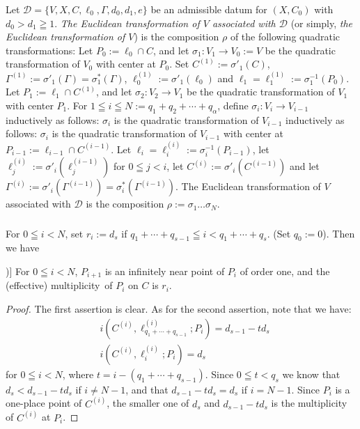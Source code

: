 \subsubsection{}\label{chap2:1.3.1}
\begin{defi*}
  Let $\mathscr{D}=\{V,X,C,\ell_{0},\Gamma,d_{0},d_{1},e\}$ be an
  admissible datum for $(X,C_{0})$ with $d_{0}>d_{1}\geqq 1$. {\em The
    Euclidean transformation of $V$ associated with $\mathscr{D}$} (or
  simply, {\em the Euclidean transformation of $V$}) is the composition
  $\rho$ of the following quadratic transformations: Let
  $P_{0}:=\ell_{0}\cap C$, and let $\sigma_{1}:V_{1}\to V_{0}:=V$ be the
  quadratic transformation of $V_{0}$ with center at $P_{0}$. Set
  $C^{(1)}:= \sigma'_{1}(C)$,
  $\Gamma^{(1)}:=\sigma'_{1}(\Gamma)=\sigma^{\ast}_{1}(\Gamma)$,
  $\ell_{0}^{(1)}:=\sigma'_{1}(\ell_{0})$ and
  $\ell_{1}=\ell^{(1)}_{1}:=\sigma^{-1}_{1}(P_{0})$. Let
  $P_{1}:=\ell_{1}\cap C^{(1)}$, and let $\sigma_{2}:V_{2}\to V_{1}$ be
  the quadratic transformation of $V_{1}$ with center $P_{1}$. For
  $1\leqq i\leqq N:=q_{1}+q_{2}+\cdots+q_{\alpha}$, define
  $\sigma_{i}:V_{i}\to V_{i-1}$ inductively as follows: $\sigma_{i}$ is
  the quadratic transformation of $V_{i-1}$ inductively as follows:
  $\sigma_{i}$ is the quadratic transformation of $V_{i-1}$ with center
  at $P_{i-1}:=\ell_{i-1}\cap C^{(i-1)}$. Let
  $\ell_{i}=\ell_{i}^{(i)}:=\sigma^{-1}_{i}(P_{i-1})$, let
  $\ell^{(i)}_{j}:=\sigma'_{i}(\ell_{j}^{(i-1)})$ for $0\leqq j<i$, let
  $C^{(i)}:=\sigma'_{i}(C^{(i-1)})$ and let
  $\Gamma^{(i)}:=\sigma'_{i}(\Gamma^{(i-1)})=\sigma^{\ast}_{i}(\Gamma^{(i-1)})$. The
  Euclidean transformation of $V$ associated with $\mathscr{D}$ is the
  composition $\rho:=\sigma_{1}\ldots \sigma_{N}$.
\end{defi*}

\subsubsection{}\label{chap2:1.3.2}
For $0\leqq i<N$, set $r_{i}:=d_{s}$ if $q_{1}+\cdots+q_{s-1}\leqq
i<q_{1}+\cdots+q_{s}$. (Set $q_{0}:=0$). Then we have

\begin{lemma*}[(\cf Nagata [43; Prop.\@ 4.3])]
For $0\leqq i<N$, $P_{i+1}$ is an infinitely near point of $P_{i}$ of
order one, and the (effective) multiplicity\pageoriginale\ of $P_{i}$
on $C$ is $r_{i}$.
\end{lemma*}

\begin{proof}
The first assertion is clear. As for the second assertion, note that
we have:
\begin{align*}
& i(C^{(i)},\ell^{(i)}_{q_{1}+\cdots+q_{s-1}};P_{i})=d_{s-1}-td_{s}\\
& i(C^{(i)},\ell^{(i)}_{i}; P_{i})=d_{s}
\end{align*}
for $0\leqq i<N$, where $t=i-(q_{1}+\cdots+q_{s-1})$. Since $0\leqq
t<q_{s}$ we know that $d_{s}<d_{s-1}-td_{s}$ if $i\neq N-1$, and that
$d_{s-1}-td_{s}=d_{s}$ if $i=N-1$. Since $P_{i}$ is a one-place point
of $C^{(i)}$, the smaller one of $d_{s}$ and $d_{s-1}-td_{s}$ is the
multiplicity of $C^{(i)}$ at $P_{i}$.
\end{proof}

